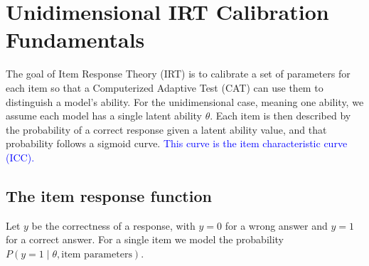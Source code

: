%   
%
%

\providecommand{\aiadd}[1]{\textcolor{blue}{#1}}
\providecommand{\aibullets}[1]{{\color{blue}#1}}

\section{Unidimensional IRT Calibration Fundamentals}
\label{app:irt-unidim}

The goal of Item Response Theory (IRT) is to calibrate a set of parameters for
each item so that a Computerized Adaptive Test (CAT) can use them to distinguish
a model's ability. For the unidimensional case, meaning one ability, we assume
each model has a single latent ability $\theta$. Each item is then described by
the probability of a correct response given a latent ability value, and that
probability follows a sigmoid curve. \aiadd{This curve is the item
characteristic curve (ICC).}

\subsection{The item response function}

Let $y$ be the correctness of a response, with $y = 0$ for a wrong answer and
$y = 1$ for a correct answer. For a single item we model the probability
$P(y = 1 \mid \theta, \text{item parameters})$.

